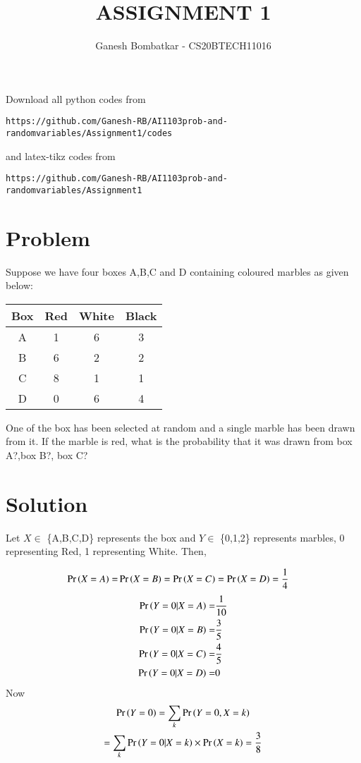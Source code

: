\documentclass[journal,12pt,twocolumn]{IEEEtran}
\begin{document}
     \def\rightbox#1{\makebox[0in][r]{#1}}
     \def\centbox#1{\makebox[0in]{#1}}
     \def\topbox#1{\raisebox{-\baselineskip}[0in][0in]{#1}}
     \def\midbox#1{\raisebox{-0.5\baselineskip}[0in][0in]{#1}}
\vspace{3cm}
\title{ASSIGNMENT 1}
\author{Ganesh Bombatkar - CS20BTECH11016}
\maketitle
\newpage
\bigskip
\renewcommand{\thefigure}{\theenumi}
\renewcommand{\thetable}{\theenumi}
Download all python codes from 
\begin{lstlisting}
https://github.com/Ganesh-RB/AI1103prob-and-randomvariables/Assignment1/codes
\end{lstlisting}
%
and latex-tikz codes from 
%
\begin{lstlisting}
https://github.com/Ganesh-RB/AI1103prob-and-randomvariables/Assignment1
\end{lstlisting}
\section{Problem}
Suppose we have four boxes A,B,C and D containing coloured marbles as given below:
\begin{center}
\begin{tabular}{||c c c c||}
    \hline
    Box &Red &White &Black \\
    \hline
    A &1 &6 &3\\
    \hline
    B &6 &2 &2\\
    \hline
    C &8 &1 &1\\
    \hline
    D &0 &6 &4\\
    \hline
\end{tabular}
\end{center}
One of the box has been selected at random and a single marble has been drawn from it. If the marble is red, what is the probability that it was drawn from box A?,box B?, box C?

\section{Solution}
Let $X\in$ \{A,B,C,D\} represents the box and $Y \in$ \{0,1,2\} represents marbles, 0 representing Red, 1 representing White. Then,

\begin{align}
    \Pr\left(X=A\right)=& \Pr\left(X=B\right)= \Pr\left(X=C\right)=\Pr\left(X=D\right)= \frac{1}{4}
\end{align}
\begin{align}
    \Pr\left(Y=0|X=A\right)=&\frac{1}{10}
    \\  \Pr\left(Y=0|X=B\right)=&\frac{3}{5}
    \\  \Pr\left(Y=0|X=C\right)=&\frac{4}{5}
    \\  \Pr\left(Y=0|X=D\right)=& 0
\end{align}
Now
\begin{multline}
    \Pr\left(Y=0\right)= \sum_{k}{\Pr\left(Y=0,X=k\right)}
    \\ =\sum_{k}{\Pr\left(Y=0|X=k\right) \times \Pr\left(X=k\right)}
    = \frac{3}{8}
\end{multline}
\end{document}
